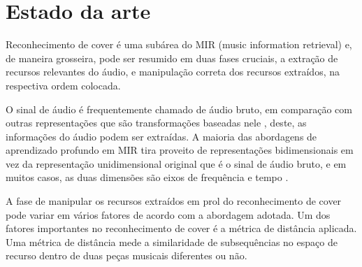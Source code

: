 \chapter{Estado da arte}

Reconhecimento de cover é uma subárea do MIR (music information retrieval) e, de maneira grosseira, pode ser resumido em duas fases cruciais, a extração de recursos relevantes do áudio, e manipulação correta dos recursos extraídos, na respectiva ordem colocada. 

O sinal de áudio é frequentemente chamado de áudio bruto, em comparação com outras representações que são transformações baseadas nele \cite{Choi2018}, deste, as informações do áudio podem ser extraídas. A maioria das abordagens de aprendizado profundo em MIR tira proveito de representações bidimensionais em vez da representação unidimensional original que é o sinal de áudio bruto, e em muitos casos, as duas dimensões são eixos de frequência e tempo \cite{Choi2018}.

A fase de manipular os recursos extraídos em prol do reconhecimento de cover pode variar em vários fatores de acordo com a abordagem adotada. Um dos fatores importantes no reconhecimento de cover é a métrica de distância aplicada. Uma métrica de distância mede a similaridade de subsequências no espaço de recurso dentro de duas peças musicais \cite{Chang2017} diferentes ou não. 

